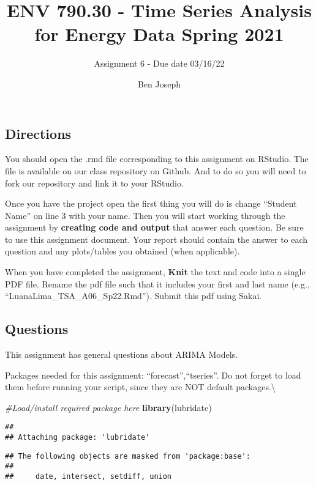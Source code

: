 \documentclass[
]{article}
\title{ENV 790.30 - Time Series Analysis for Energy Data \textbar{} Spring 2021}
\subtitle{Assignment 6 - Due date 03/16/22}
\author{Ben Joseph}
\date{}
\newenvironment{Shaded}{\begin{snugshade}}{\end{snugshade}}
\newcommand{\CommentTok}[1]{\textcolor[rgb]{0.56,0.35,0.01}{\textit{#1}}}
\newcommand{\KeywordTok}[1]{\textcolor[rgb]{0.13,0.29,0.53}{\textbf{#1}}}
\newcommand{\NormalTok}[1]{#1}
\begin{document}
\maketitle

\hypertarget{directions}{%
\subsection{Directions}\label{directions}}

You should open the .rmd file corresponding to this assignment on
RStudio. The file is available on our class repository on Github. And to
do so you will need to fork our repository and link it to your RStudio.

Once you have the project open the first thing you will do is change
``Student Name'' on line 3 with your name. Then you will start working
through the assignment by \textbf{creating code and output} that answer
each question. Be sure to use this assignment document. Your report
should contain the answer to each question and any plots/tables you
obtained (when applicable).

When you have completed the assignment, \textbf{Knit} the text and code
into a single PDF file. Rename the pdf file such that it includes your
first and last name (e.g., ``LuanaLima\_TSA\_A06\_Sp22.Rmd''). Submit
this pdf using Sakai.

\hypertarget{questions}{%
\subsection{Questions}\label{questions}}

This assignment has general questions about ARIMA Models.

Packages needed for this assignment: ``forecast'',``tseries''. Do not
forget to load them before running your script, since they are NOT
default packages.\textbackslash{}

\begin{Shaded}
\begin{Highlighting}[]
\CommentTok{#Load/install required package here}
\KeywordTok{library}\NormalTok{(lubridate)}
\end{Highlighting}
\end{Shaded}

\begin{verbatim}
## 
## Attaching package: 'lubridate'
\end{verbatim}

\begin{verbatim}
## The following objects are masked from 'package:base':
## 
##     date, intersect, setdiff, union
\end{verbatim}
\end{document}
